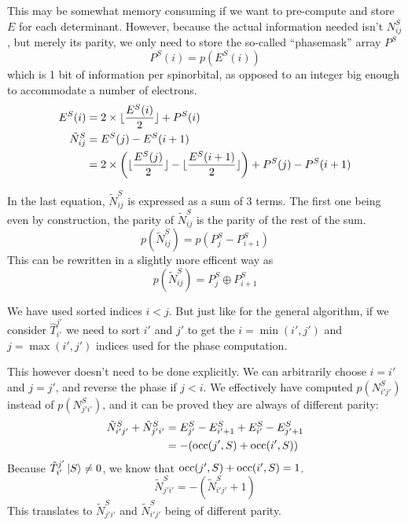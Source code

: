 \documentclass[./thesis.tex]{subfiles}
\begin{document}
This may be somewhat memory consuming if we want to pre-compute and store $E$ for each determinant. However, because the actual information needed isn't $N^S_{ij}$, but merely its parity, we only need to store the so-called ``phasemask'' array $P^S$
\begin{equation}
P^S(i) = p(E^S(i))
\end{equation}
which is 1 bit of information per spinorbital, as opposed to an integer big enough to accommodate a number of electrons.
\begin{align}
E^S(i) & = 2 \times  \lfloor \frac{E^S(i)}{2} \rfloor + P^S(i) \\
\tilde N^S_{ij} & = E^S(j) - E^S(i+1) \\
 & = 2 \times \qty( \lfloor \frac{E^S(j)}{2} \rfloor - \lfloor \frac{E^S(i+1)}{2} \rfloor ) + P^S(j) - P^S(i+1)
\end{align}
	    
In the last equation, $\tilde N^S_{ij}$ is expressed as a sum of 3 terms. The first one being even by construction, the parity of $\tilde N^S_{ij}$ is the parity of the rest of the sum.
\begin{equation}
p(\tilde N^S_{ij})=p(P^S_j - P^S_{i+1})
\end{equation}
This can be rewritten in a slightly more efficent way as
\begin{equation}
p(\tilde N^S_{ij}) = P^S_j \oplus P^S_{i+1}
\end{equation}


We have used sorted indices $i<j$. But just like for the general algorithm, if we consider $\hat T_{i'}^{j'}$ we need to sort $i'$ and $j'$ to get the $i=\min(i', j')$ and $j=\max(i', j')$ indices used for the phase computation.

This however doesn't need to be done explicitly. We can arbitrarily choose $i=i'$ and $j=j'$, and reverse the phase if $j<i$. We effectively have computed $p(N^S_{i'j'})$ instead of $p(N^S_{j'i'})$, and it can be proved they are always of different parity:
\begin{align}
\tilde N^{S}_{i' j'} + \tilde N^{S}_{j'i'} & = E^{S}_{j'} - E^S_{i'+1} + E^S_{i'} - E^S_{j'+1} \\
& = -\qty( {\text{occ}(j',S)} + {\text{occ}(i',S)})
\end{align}
Because $\hat T_{i'}^{j'} \ket S \neq 0$, we know that ${\text{occ}(j',S)} + {\text{occ}(i',S)} = 1$. 
\begin{equation}
\tilde N^{S}_{j' i'} = -(\tilde N^{S}_{i'j'} + 1)
\end{equation}
This translates to $\tilde N^{S}_{j' i'}$ and $\tilde N^{S}_{i'j'}$ being of different parity.
\end{document}
